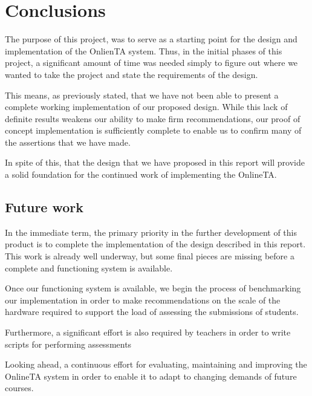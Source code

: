 \chapter{Conclusions}
The purpose of this project, was to serve as a starting point for the
design and implementation of the OnlienTA system. Thus, in the initial
phases of this project, a significant amount of time was needed simply
to figure out where we wanted to take the project and state
the requirements of the design.

This means, as previously stated, that we have not been able to
present a complete working implementation of our proposed
design. While this lack of definite results weakens our ability to
make firm recommendations, our proof of concept implementation is
sufficiently complete to enable us to confirm many of the
assertions that we have made.

In spite of this, that the design that we have proposed in this report
will provide a solid foundation for the continued work of implementing
the OnlineTA.




\section{Future work}
In the immediate term, the primary priority in the further development
of this product is to complete the implementation of the design
described in this report. This work is already well underway, but some
final pieces are missing before a complete and functioning system is
available.

Once our functioning system is available, we begin the process of
benchmarking our implementation in order to make recommendations on
the scale of the hardware required to support the load of assessing
the submissions of students.

Furthermore, a significant effort is also required by teachers in
order to write scripts for performing assessments

Looking ahead, a continuous effort for evaluating, maintaining and
improving the OnlineTA system in order to enable it to adapt to
changing demands of future courses.




